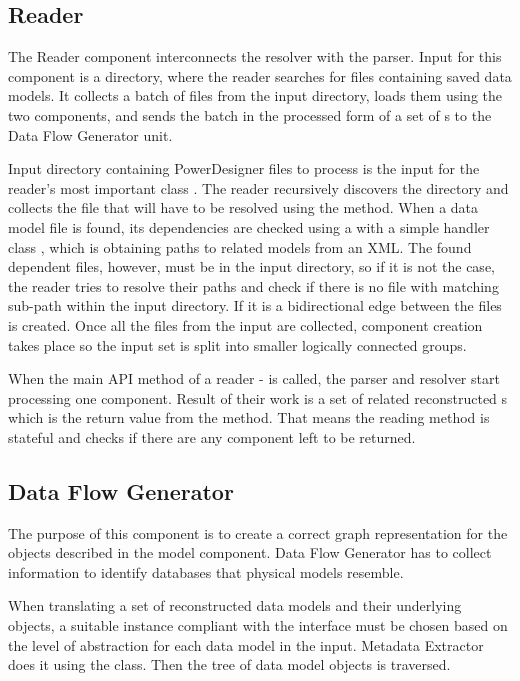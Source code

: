 \subsection{Reader}

The Reader component interconnects the resolver with the parser. Input for this component is a directory, where the reader searches for files containing saved data models. It collects a batch of files from the input directory, loads them using the two components, and sends the batch in the processed form of a set of s to the Data Flow Generator unit.

Input directory containing PowerDesigner files to process is the input for the reader's most important class . 
The reader recursively discovers the directory and collects the file that will have to be resolved using the  method. 
When a data model file is found, its dependencies are checked using a  with a simple handler class , which is obtaining paths to related models from an XML.
The found dependent files, however, must be in the input directory, so if it is not the case, the reader tries to resolve their paths and check if there is no file with matching sub-path within the input directory. If it is a bidirectional edge between the files is created. 
Once all the files from the input are collected, component creation takes place so the input set is split into smaller logically connected groups.

When the main API method of a reader -  is called, the parser and resolver start processing one component. Result of their work is a set of related reconstructed s which is the return value from the method. 
That means the reading method is stateful and  checks if there are any component left to be returned.

\subsection{Data Flow Generator}

The purpose of this component is to create a correct graph representation for the objects described in the model component. Data Flow Generator has to collect information to identify databases that physical models resemble.

When translating a set of reconstructed data models and their underlying objects, a suitable instance compliant with the  interface must be chosen based on the level of abstraction for each data model in the input. Metadata Extractor does it using the  class.
Then the tree of data model objects is traversed.

